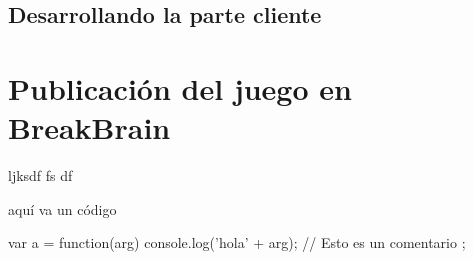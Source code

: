 \subsection{Desarrollando la parte cliente}


\section{Publicación del juego en BreakBrain}









ljksdf
fs
df




aquí va un código

\begin{listing}[language=JavaScript, caption={Hola mundo en C}, label=code:hello]
var a = function(arg){
  console.log('hola' + arg); // Esto es un comentario
};
\end{listing}

